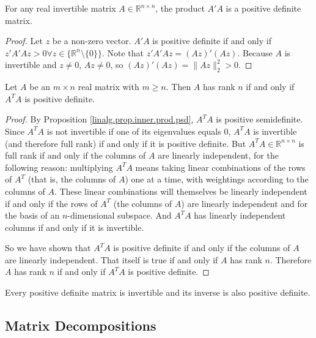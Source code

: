 \begin{proposition}
For any real invertible matrix \(A \in \mathbb{R}^{n \times n}\), the product \(A' A\) is a positive definite matrix. 

\end{proposition}

\begin{proof} Let \(z\) be a non-zero vector. \(A'A\) is positive definite if and only if \(z' A' A z >0 \forall z \in \{\mathbb{R}^n \setminus \{0\}\}\). Note that \(z' A' A z = (Az)'(Az)\). Because \(A\) is invertible and \(z \neq 0\), \(Az \neq 0 \), so \((Az)'(Az) = \lVert Az \rVert_2^2 > 0\).
\end{proof}



\begin{proposition}
Let $A$ be an $m\times n$ real matrix with $m\geq n$. Then $A$ has rank $n$ if and only if $A^{T}A$ is positive definite.
\end{proposition}

\begin{proof}


By Proposition \ref{linalg.prop.inner.prod.psd}, \(A^TA\) is positive semidefinite. Since \(A^TA\) is not invertible if one of its eigenvalues equals 0, \(A^TA\) is invertible (and therefore full rank) if and only if it is positive definite. But \(A^TA \in \mathbb{R}^{n \times n}\) is full rank if and only if the columns of \(A\) are linearly independent, for the following reason: multiplying \(A^TA\) means taking linear combinations of the rows of \(A^T\) (that is, the columns of \(A\)) one at a time, with weightings according to the columns of \(A\). These linear combinations will themselves be linearly independent if and only if the rows of \(A^T\) (the columns of \(A\)) are linearly independent and for the basis of an \(n\)-dimensional subspace. And \(A^TA\) has linearly independent columns if and only if it is invertible.

So we have shown that \(A^TA\) is positive definite if and only if the columns of \(A\) are linearly independent. That itself is true if and only if \(A\) has rank \(n\). Therefore \(A\) has rank \(n\) if and only if \(A^TA\) is positive definite.

\end{proof}


Every positive definite matrix is invertible and its inverse is also positive definite.

\subsection{Matrix Decompositions}\label{linalg.mat.decomp}

